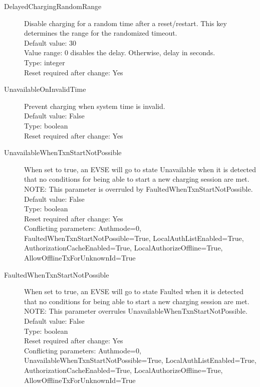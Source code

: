 \begin{description}
\item[DelayedChargingRandomRange] Disable charging for a random time after a reset/restart. This key determines the range for the randomized timeout.\\
  Default value: 30\\
  Value range: 0 disables the delay. Otherwise, delay in seconds.\\
  Type: integer\\
  Reset required after change: Yes\\

\item[UnavailableOnInvalidTime] Prevent charging when system time is invalid.\\
  Default value: False\\
  Type: boolean\\
  Reset required after change: Yes\\

\item[UnavailableWhenTxnStartNotPossible] When set to true, an EVSE will go to state Unavailable when it is detected that no conditions for being able to start a new charging session are met. NOTE: This parameter is overruled by FaultedWhenTxnStartNotPossible.\\
  Default value: False\\
  Type: boolean\\
  Reset required after change: Yes\\
  Conflicting parameters: Authmode=0, FaultedWhenTxnStartNotPossible=True, LocalAuthListEnabled=True, AuthorizationCacheEnabled=True, LocalAuthorizeOffline=True, AllowOfflineTxForUnknownId=True\\

\item[FaultedWhenTxnStartNotPossible] When set to true, an EVSE will go to state Faulted when it is detected that no conditions for being able to start a new charging session are met. NOTE: This parameter overrules UnavailableWhenTxnStartNotPossible.\\
  Default value: False\\
  Type: boolean\\
  Reset required after change: Yes\\
  Conflicting parameters: Authmode=0, UnavailableWhenTxnStartNotPossible=True, LocalAuthListEnabled=True, AuthorizationCacheEnabled=True, LocalAuthorizeOffline=True, AllowOfflineTxForUnknownId=True\\


\end{description}
